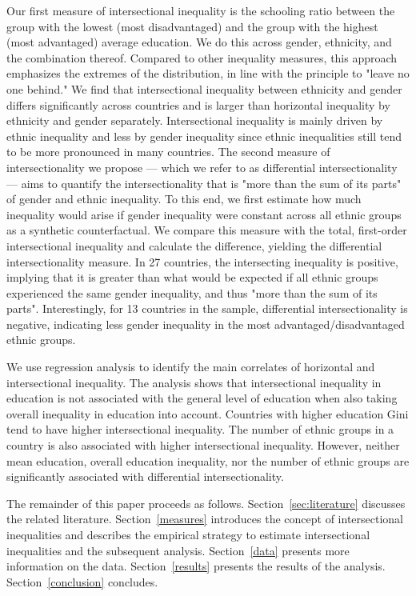 Our first measure of intersectional inequality is the schooling ratio between the group with the lowest (most disadvantaged) and the group with the highest (most advantaged) average education. We do this across gender, ethnicity, and the combination thereof. Compared to other inequality measures, this approach emphasizes the extremes of the distribution, in line with the principle to "leave no one behind." We find that intersectional inequality between ethnicity and gender differs significantly across countries and is larger than horizontal inequality by ethnicity and gender separately. Intersectional inequality is mainly driven by ethnic inequality and less by gender inequality since ethnic inequalities still tend to be more pronounced in many countries. The second measure of intersectionality we propose --- which we refer to as differential intersectionality --- aims to quantify the intersectionality that is "more than the sum of its parts" of gender and ethnic inequality. To this end, we first estimate how much inequality would arise if gender inequality were constant across all ethnic groups as a synthetic counterfactual. We compare this measure with the total, first-order intersectional inequality and calculate the difference, yielding the differential intersectionality measure. In 27 countries, the intersecting inequality is positive, implying that it is greater than what would be expected if all ethnic groups experienced the same gender inequality, and thus "more than the sum of its parts". Interestingly, for 13 countries in the sample, differential intersectionality is negative, indicating less gender inequality in the most advantaged/disadvantaged ethnic groups. 

We use regression analysis to identify the main correlates of horizontal and intersectional inequality. The analysis shows that intersectional inequality in education is not associated with the general level of education when also taking overall inequality in education into account. Countries with higher education Gini tend to have higher intersectional inequality. The number of ethnic groups in a country is also associated with higher intersectional inequality. However, neither mean education, overall education inequality, nor the number of ethnic groups are significantly associated with differential intersectionality. 

The remainder of this paper proceeds as follows. Section~\ref{sec:literature} discusses the related literature. Section~\ref{measures} introduces the concept of intersectional inequalities and describes the empirical strategy to estimate intersectional inequalities and the subsequent analysis. Section~\ref{data} presents more information on the data. Section~\ref{results} presents the results of the analysis. Section~\ref{conclusion} concludes.

